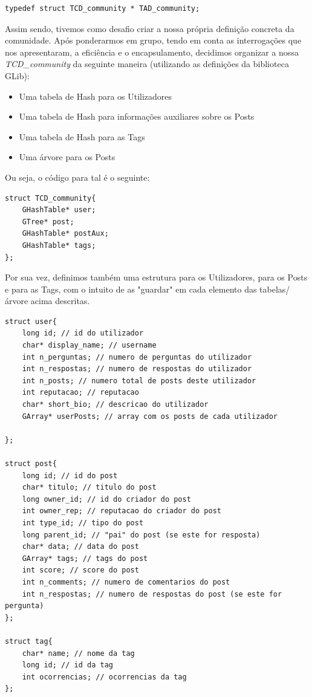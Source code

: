 \documentclass[a4paper, 11pt, oneside]{article}
\begin{document}
\begin{lstlisting}[caption=Definição da TAD\_community]
typedef struct TCD_community * TAD_community;
\end{lstlisting}

Assim sendo, tivemos como desafio criar a nossa própria definição concreta da comunidade. Após ponderarmos em grupo, tendo em conta as interrogações que nos apresentaram, a eficiência e o encapsulamento, decidimos organizar a nossa \textit{TCD\_community} da seguinte maneira (utilizando as definições da biblioteca GLib):
\begin{itemize}
\item Uma tabela de Hash para os Utilizadores
\item Uma tabela de Hash para informações auxiliares sobre os Posts
\item Uma tabela de Hash para as Tags
\item Uma árvore para os Posts
\end{itemize}

Ou seja, o código para tal é o seguinte:
\begin{lstlisting}[caption=Definição da TCD\_community]
struct TCD_community{
	GHashTable* user;
	GTree* post;
	GHashTable* postAux;
	GHashTable* tags;	
};
\end{lstlisting}

Por sua vez, definimos também uma estrutura para os Utilizadores, para os Posts e para as Tags, com o intuito de as "guardar" em cada elemento das tabelas/árvore acima descritas.

\begin{lstlisting}[caption=Definição de estruturas internas]
struct user{
	long id; // id do utilizador
	char* display_name; // username
	int n_perguntas; // numero de perguntas do utilizador
	int n_respostas; // numero de respostas do utilizador
	int n_posts; // numero total de posts deste utilizador
	int reputacao; // reputacao
	char* short_bio; // descricao do utilizador
	GArray* userPosts; // array com os posts de cada utilizador

};

struct post{
	long id; // id do post
	char* titulo; // titulo do post
	long owner_id; // id do criador do post
	int owner_rep; // reputacao do criador do post
	int type_id; // tipo do post
	long parent_id; // "pai" do post (se este for resposta)
	char* data; // data do post
	GArray* tags; // tags do post
	int score; // score do post
	int n_comments; // numero de comentarios do post
	int n_respostas; // numero de respostas do post (se este for pergunta)
};

struct tag{
	char* name; // nome da tag
	long id; // id da tag
	int ocorrencias; // ocorrencias da tag
};
\end{lstlisting}
\end{document}

